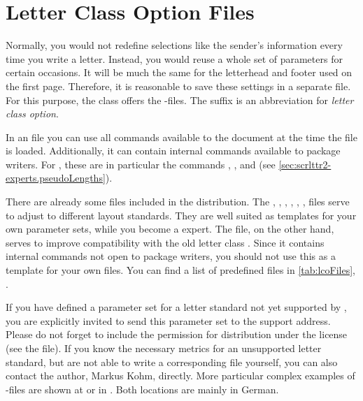 \section{Letter Class Option Files}
\label{sec:scrlttr2.lcoFile}%
%
%
%

Normally, you would not redefine selections like the sender's information
every time you write a letter. Instead, you would reuse a whole set of
parameters for certain occasions. It will be much the same for the letterhead
and footer used on the first page. Therefore, it is reasonable to save these
settings in a separate file. For this purpose, the  class
offers the -files. The  suffix is an abbreviation for
\emph{\emph{l}etter \emph{c}lass \emph{o}ption}.

In an  file you can use all commands available to the document at
the time the  file is loaded.  Additionally, it can contain internal
commands available to package writers. For , these are in
particular the commands ,
, and
 (see
\autoref{sec:scrlttr2-experts.pseudoLengths}).

There are already some  files included in the {\KOMAScript}
distribution. The , , ,
, , ,
 files serve to adjust
{\KOMAScript} to different layout standards. They are well suited as templates
for your own parameter sets, while you become a \KOMAScript{} expert. The
 file, on the other hand, serves to improve compatibility
with the old letter class .  Since it contains internal
commands not open to package writers, you should not use this as a template
for your own  files. You can find a list of predefined 
files in \autoref{tab:lcoFiles}, .

If you have defined a parameter set for a letter standard not yet supported by
\KOMAScript, you are explicitly invited to send this parameter set to the
{\KOMAScript} support address. Please do not forget to include the permission
for distribution under the {\KOMAScript} license (see the 
file). If you know the necessary metrics for an unsupported letter standard,
but are not able to write a corresponding  file yourself, you can
also contact the {\KOMAScript} author, Markus Kohm, directly. More
particular complex examples of -files are shown at \cite{homepage}
or in \cite{DANTE:TK0203:MJK}. Both locations are mainly in German. 

